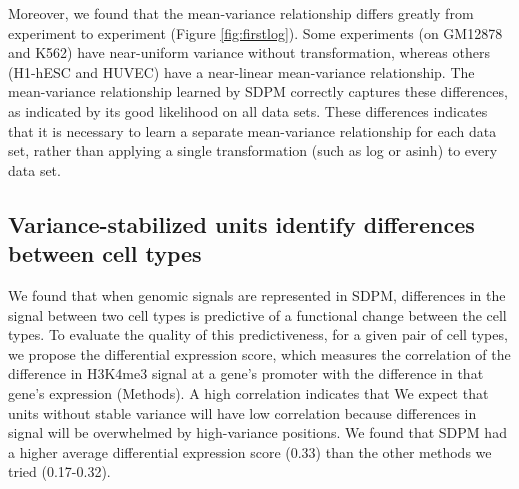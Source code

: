 \documentclass[11pt]{article}
\begin{document}
Moreover, we found that the mean-variance relationship differs greatly from experiment to experiment (Figure \ref{fig:firstlog}).
Some experiments (on GM12878 and K562) have near-uniform variance without transformation, whereas others (H1-hESC and HUVEC) have a near-linear mean-variance relationship.
The mean-variance relationship learned by SDPM correctly captures these differences, as indicated by its good likelihood on all data sets. 
These differences indicates that it is necessary to learn a separate mean-variance relationship for each data set, rather than applying a single transformation (such as log or asinh) to every data set.





\subsection{Variance-stabilized units identify differences between cell types}

We found that when genomic signals are represented in SDPM, differences in the signal between two cell types is predictive of a functional change between the cell types. 
To evaluate the quality of this predictiveness, for a given pair of cell types, we propose the differential expression score, which measures the
correlation of the difference in H3K4me3 signal at a gene's promoter with the difference in that gene's expression (Methods).
A high correlation indicates that 
We expect that units without stable variance will have low correlation because differences in signal will be overwhelmed by high-variance positions.
We found that SDPM had a higher average differential expression score (0.33) than the other methods we tried (0.17-0.32).
\end{document}

